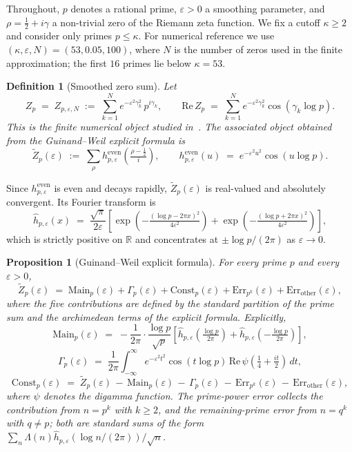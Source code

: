 \documentclass[11pt]{article}
\newtheorem{proposition}[theorem]{Proposition}
\newtheorem{definition}[theorem]{Definition}
\newcommand{\Zt}{\widetilde{Z}}
\begin{document}
Throughout, $p$ denotes a rational prime, $\varepsilon>0$ a smoothing
parameter, and $\rho=\tfrac12+i\gamma$ a non-trivial zero of the
Riemann zeta function.
We fix a cutoff $\kappa\ge 2$ and consider only primes $p\le\kappa$.
For numerical reference we use $(\kappa,\varepsilon,N)=(53,0.05,100)$,
where $N$ is the number of zeros used in the finite approximation;
the first $16$ primes lie below $\kappa=53$.

\begin{definition}[Smoothed zero sum]
\label{def:smoothed}
Let
\[
Z_p \;=\; Z_{p,\varepsilon,N} \;:=\; \sum_{k=1}^{N} e^{-\varepsilon^2\gamma_k^2}\,
p^{i\gamma_k},
\qquad
\mathrm{Re}\,Z_p \;=\; \sum_{k=1}^{N} e^{-\varepsilon^2\gamma_k^2}
                        \cos(\gamma_k\log p).
\]
This is the finite numerical object studied in~\cite{Paper4,Paper5}.
The associated object obtained from the Guinand--Weil explicit formula is
\[
\Zt_p(\varepsilon) \;:=\; \sum_{\rho} h^{\mathrm{even}}_{p,\varepsilon}
\!\left(\tfrac{\rho-\tfrac12}{i}\right),
\qquad
h^{\mathrm{even}}_{p,\varepsilon}(u) \;=\; e^{-\varepsilon^2 u^2}
                                            \cos(u\log p).
\]
\end{definition}

Since $h^{\mathrm{even}}_{p,\varepsilon}$ is even and decays rapidly,
$\Zt_p(\varepsilon)$ is real-valued and absolutely convergent.
Its Fourier transform is
\[
\widehat{h}_{p,\varepsilon}(x) \;=\; \frac{\sqrt{\pi}}{2\varepsilon}
\!\left[\exp\!\left(-\tfrac{(\log p-2\pi x)^2}{4\varepsilon^2}\right)
      +\exp\!\left(-\tfrac{(\log p+2\pi x)^2}{4\varepsilon^2}\right)
\right],
\]
which is strictly positive on $\mathbb R$ and concentrates at
$\pm\log p/(2\pi)$ as $\varepsilon\to 0$.

\begin{proposition}[Guinand--Weil explicit formula]
\label{prop:gw}
For every prime $p$ and every $\varepsilon>0$,
\[
\Zt_p(\varepsilon) \;=\; \mathrm{Main}_p(\varepsilon)
                       + \Gamma_p(\varepsilon)
                       + \mathrm{Const}_p(\varepsilon)
                       + \mathrm{Err}_{p^k}(\varepsilon)
                       + \mathrm{Err}_{\mathrm{other}}(\varepsilon),
\]
where the five contributions are defined by the standard partition of
the prime sum and the archimedean terms of the explicit formula.
Explicitly,
\[
\mathrm{Main}_p(\varepsilon) \;=\; -\frac{1}{2\pi}\cdot\frac{\log p}{\sqrt p}
\!\left[\widehat{h}_{p,\varepsilon}\!\left(\tfrac{\log p}{2\pi}\right)
      +\widehat{h}_{p,\varepsilon}\!\left(-\tfrac{\log p}{2\pi}\right)
\right],
\]
\[
\Gamma_p(\varepsilon) \;=\; \frac{1}{2\pi}\int_{-\infty}^{\infty}
e^{-\varepsilon^2 t^2}\cos(t\log p)\,
\mathrm{Re}\,\psi\!\left(\tfrac14 + \tfrac{it}{2}\right)\,dt,
\]
\[
\mathrm{Const}_p(\varepsilon) \;=\; \Zt_p(\varepsilon)
\,-\, \mathrm{Main}_p(\varepsilon)
\,-\, \Gamma_p(\varepsilon)
\,-\, \mathrm{Err}_{p^k}(\varepsilon)
\,-\, \mathrm{Err}_{\mathrm{other}}(\varepsilon),
\]
where $\psi$ denotes the digamma function.
The prime-power error collects the contribution from $n=p^k$ with
$k\ge 2$, and the remaining-prime error from $n=q^k$ with $q\neq p$;
both are standard sums of the form
$\sum_n\Lambda(n)\widehat{h}_{p,\varepsilon}(\log n/(2\pi))/\sqrt n$.
\end{proposition}
\end{document}
